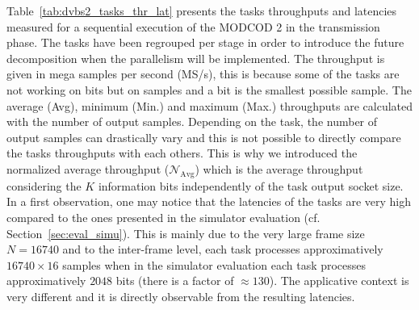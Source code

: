 Table~\ref{tab:dvbs2_tasks_thr_lat} presents the tasks throughputs and latencies
measured for a sequential execution of the MODCOD 2 in the transmission phase.
The tasks have been regrouped per stage in order to introduce the future
decomposition when the parallelism will be implemented. The throughput is given
in mega samples per second (MS/s), this is because some of the tasks are not
working on bits but on samples and a bit is the smallest possible sample. The
average (Avg), minimum (Min.) and maximum (Max.) throughputs are calculated with
the number of output samples. Depending on the task, the number of output
samples can drastically vary and this is not possible to directly compare the
tasks throughputs with each others. This is why we introduced the normalized
average throughput ($\mathcal{N}_\text{Avg}$) which is the average throughput
considering the $K$ information bits independently of the task output socket
size. In a first observation, one may notice that the latencies of the tasks are
very high compared to the ones presented in the simulator evaluation (cf.
Section~\ref{sec:eval_simu}). This is mainly due to the very large frame size
$N = 16740$ and to the inter-frame level, each task processes approximatively
$16740 \times 16$ samples when in the simulator evaluation each task processes
approximatively $2048$ bits (there is a factor of $\approx 130$). The
applicative context is very different and it is directly observable from the
resulting latencies.

